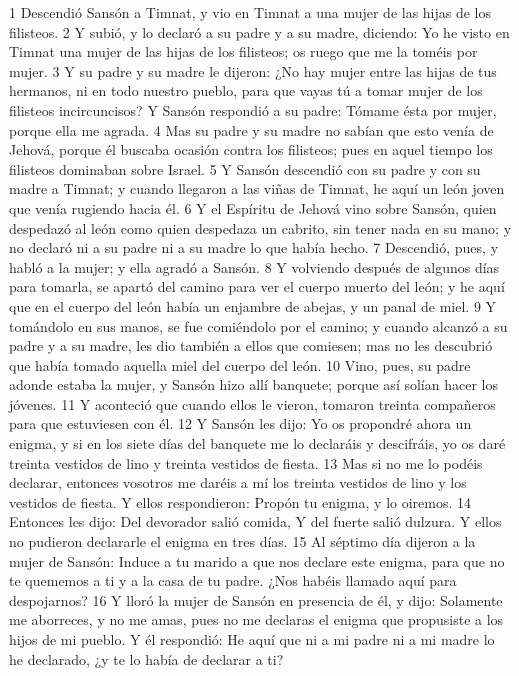 1 Descendió Sansón a Timnat, y vio en Timnat a una mujer de las hijas de los filisteos.
2 Y subió, y lo declaró a su padre y a su madre, diciendo: Yo he visto en Timnat una mujer de las hijas de los filisteos; os ruego que me la toméis por mujer.
3 Y su padre y su madre le dijeron: ¿No hay mujer entre las hijas de tus hermanos, ni en todo nuestro pueblo, para que vayas tú a tomar mujer de los filisteos incircuncisos? Y Sansón respondió a su padre: Tómame ésta por mujer, porque ella me agrada.
4 Mas su padre y su madre no sabían que esto venía de Jehová, porque él buscaba ocasión contra los filisteos; pues en aquel tiempo los filisteos dominaban sobre Israel.
5 Y Sansón descendió con su padre y con su madre a Timnat; y cuando llegaron a las viñas de Timnat, he aquí un león joven que venía rugiendo hacia él.
6 Y el Espíritu de Jehová vino sobre Sansón, quien despedazó al león como quien despedaza un cabrito, sin tener nada en su mano; y no declaró ni a su padre ni a su madre lo que había hecho.
7 Descendió, pues, y habló a la mujer; y ella agradó a Sansón.
8 Y volviendo después de algunos días para tomarla, se apartó del camino para ver el cuerpo muerto del león; y he aquí que en el cuerpo del león había un enjambre de abejas, y un panal de miel.
9 Y tomándolo en sus manos, se fue comiéndolo por el camino; y cuando alcanzó a su padre y a su madre, les dio también a ellos que comiesen; mas no les descubrió que había tomado aquella miel del cuerpo del león.
10 Vino, pues, su padre adonde estaba la mujer, y Sansón hizo allí banquete; porque así solían hacer los jóvenes.
11 Y aconteció que cuando ellos le vieron, tomaron treinta compañeros para que estuviesen con él.
12 Y Sansón les dijo: Yo os propondré ahora un enigma, y si en los siete días del banquete me lo declaráis y descifráis, yo os daré treinta vestidos de lino y treinta vestidos de fiesta.
13 Mas si no me lo podéis declarar, entonces vosotros me daréis a mí los treinta vestidos de lino y los vestidos de fiesta. Y ellos respondieron: Propón tu enigma, y lo oiremos.
14 Entonces les dijo:
Del devorador salió comida,
Y del fuerte salió dulzura.
Y ellos no pudieron declararle el enigma en tres días.
15 Al séptimo día dijeron a la mujer de Sansón: Induce a tu marido a que nos declare este enigma, para que no te quememos a ti y a la casa de tu padre. ¿Nos habéis llamado aquí para despojarnos?
16 Y lloró la mujer de Sansón en presencia de él, y dijo: Solamente me aborreces, y no me amas, pues no me declaras el enigma que propusiste a los hijos de mi pueblo. Y él respondió: He aquí que ni a mi padre ni a mi madre lo he declarado, ¿y te lo había de declarar a ti?
